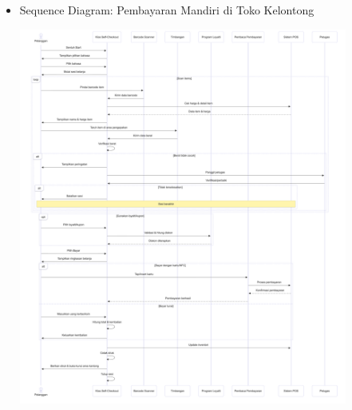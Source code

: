 \documentclass[a4paper]{article}
\begin{document}
\begin{enumerate}[itemsep=1em]
  \begin{itemize}[itemsep=1em]
    \item Sequence Diagram: Pembayaran Mandiri di Toko Kelontong
    \begin{center}
      \includegraphics[width=0.85\textwidth,keepaspectratio]{self-checkout-sequence-diagram.png}
    \end{center}
  \end{itemize}

  \pagebreak


\end{enumerate}
\end{document}
